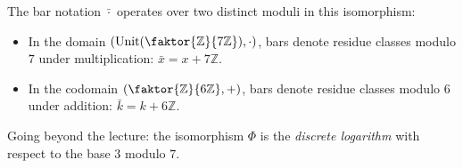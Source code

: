 \begin{content}
\begin{steps}
The bar notation $\bar{\cdot}$ operates over two distinct moduli in this isomorphism:
\begin{itemize}
    \item In the domain $(\operatorname{Unit}(\faktor{\mathbb{Z}}{7\mathbb{Z}}), \cdot)$, bars denote residue classes modulo $7$ under multiplication: $\bar{x} = x + 7\mathbb{Z}$.
    \item In the codomain $(\faktor{\mathbb{Z}}{6\mathbb{Z}}, +)$, bars denote residue classes modulo $6$ under addition: $\bar{k} = k + 6\mathbb{Z}$.
\end{itemize}
Going beyond the lecture: the isomorphism $\Phi$ is the \emph{discrete logarithm} with respect to the base $3$ modulo $7$.
\end{steps}
\end{content}

